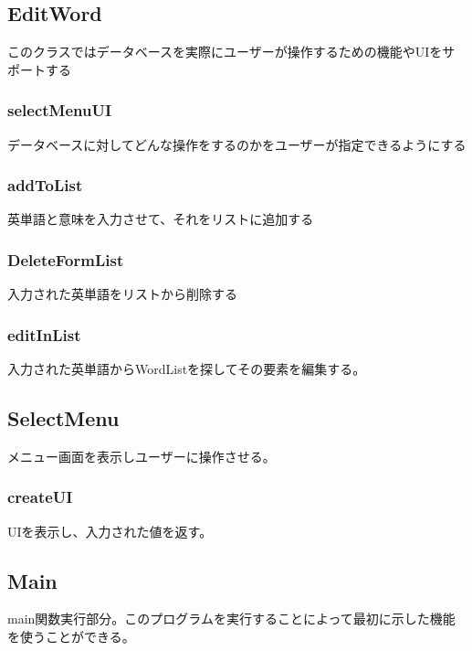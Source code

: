 \documentclass{ltjsarticle}
\begin{document}
\subsection{EditWord}
このクラスではデータベースを実際にユーザーが操作するための機能やUIをサポートする
\subsubsection{selectMenuUI}
データベースに対してどんな操作をするのかをユーザーが指定できるようにする
\subsubsection{addToList}
英単語と意味を入力させて、それをリストに追加する
\subsubsection{DeleteFormList}
入力された英単語をリストから削除する
\subsubsection{editInList}
入力された英単語からWordListを探してその要素を編集する。


\subsection{SelectMenu}
メニュー画面を表示しユーザーに操作させる。
\subsubsection{createUI}
UIを表示し、入力された値を返す。
\subsection{Main}
main関数実行部分。このプログラムを実行することによって最初に示した機能を使うことができる。
\end{document}
